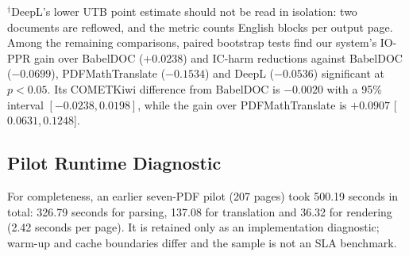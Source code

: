 \begin{table}[H]
\centering
\caption{Complete end-to-end results. Quality metrics report mean [95\%
cluster-bootstrap interval]; runner time is a point estimate. Bold marks the
best translated-PDF system by point estimate.}
\label{tab:app-e2e-full}
\scriptsize
\setlength{\tabcolsep}{3.2pt}
\end{table}

${}^{\dagger}$DeepL's lower UTB point estimate should not be read in isolation: two documents
are reflowed, and the metric counts English blocks per output page. Among the
remaining comparisons, paired bootstrap tests find our system's IO-PPR gain
over BabelDOC ($+0.0238$) and IC-harm reductions against BabelDOC ($-0.0699$),
PDFMathTranslate ($-0.1534$) and DeepL ($-0.0536$) significant at $p<0.05$.
Its COMETKiwi difference from BabelDOC is $-0.0020$ with a 95\% interval
$[-0.0238,0.0198]$, while the gain over PDFMathTranslate is $+0.0907$
[$0.0631,0.1248$].

\subsection{Pilot Runtime Diagnostic}

For completeness, an earlier seven-PDF pilot (207 pages) took 500.19 seconds in
total: 326.79 seconds for parsing, 137.08 for translation and 36.32 for rendering
(2.42 seconds per page). It is retained only as an implementation diagnostic;
warm-up and cache boundaries differ and the sample is not an SLA benchmark.

